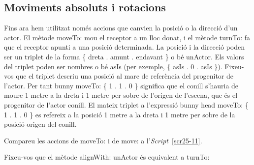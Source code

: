\subsection{Moviments absoluts i rotacions}
Fins ara hem utilitzat només accions que canvien la posició o la direcció d'un actor. El mètode \textsf{moveTo:} mou el receptor a un lloc donat, i el mètode \textsf{turnTo:} fa que el receptor apunti a una posició determinada. La posició i la direcció poden ser un triplet de la forma \textsf{\{ dreta . amunt . endavant \}} o bé \textsf{unActor}. Els valors del triplet poden ser nombres o bé \textsf{asIs} (per exemple, \textsf{\{ asIs . 0 . asIs \}}). Fixeu-vos que el triplet descriu una posició al marc de referència del progenitor de l'actor. Per tant \textsf{bunny moveTo: \{ 1 . 1 . 0 \}} significa que el conill s'hauria de moure 1 metre a la dreta i 1 metre per sobre de l'origen de l'escena, que és el progenitor de l'actor conill. El mateix triplet a l'expressió \textsf{bunny head moveTo: \{ 1 . 1 . 0 \}} es refereix a la posició 1 metre a la dreta i 1 metre per sobre de la posició origen del conill.

Compareu les accions de \textsf{moveTo:} i de \textsf{move:} a l'\emph{Script}~\ref{scr25-11}.

Fixeu-vos que el mètode \textsf{alignWith: unActor} és equivalent a \textsf{turnTo:}

